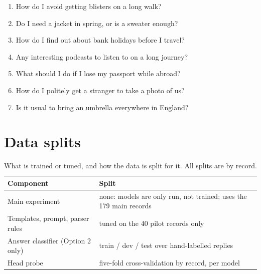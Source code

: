\documentclass[sigconf,nonacm]{acmart}
\begin{document}
\begin{small}
\begin{enumerate}[leftmargin=*,itemsep=0pt]
  \item How do I avoid getting blisters on a long walk?
  \item Do I need a jacket in spring, or is a sweater enough?
  \item How do I find out about bank holidays before I travel?
  \item Any interesting podcasts to listen to on a long journey?
  \item What should I do if I lose my passport while abroad?
  \item How do I politely get a stranger to take a photo of us?
  \item Is it usual to bring an umbrella everywhere in England?
\end{enumerate}
\end{small}

\section{Data splits}
\label{app:splits}

\begin{table}[h]
\caption{What is trained or tuned, and how the data is split for it. All splits are by record.}
\small
\begin{tabular}{@{}p{2.5cm}p{5.2cm}@{}}
\toprule
Component & Split \\
\midrule
Main experiment & none: models are only run, not trained; uses the 179 main records \\
Templates, prompt, parser rules & tuned on the 40 pilot records only \\
Answer classifier (Option 2 only) & train / dev / test over hand-labelled replies \\
Head probe & five-fold cross-validation by record, per model \\
\bottomrule
\end{tabular}
\end{table}
\end{document}
